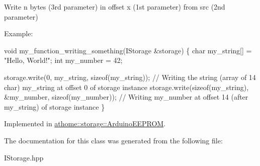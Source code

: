 Write n bytes (3rd parameter) in offset x (1st parameter) from src (2nd parameter)

Example\+:


\begin{DoxyCode}
\textcolor{keywordtype}{void} my\_function\_writing\_something(IStorage &storage) \{
  \textcolor{keywordtype}{char} my\_string[] = \textcolor{stringliteral}{"Hello, World!"};
  \textcolor{keywordtype}{int} my\_number = 42;

  storage.write(0, my\_string, \textcolor{keyword}{sizeof}(my\_string)); \textcolor{comment}{// Writing the string (array of 14 char) my\_string at
       offset 0 of storage instance}
  storage.write(\textcolor{keyword}{sizeof}(my\_string), &my\_number, \textcolor{keyword}{sizeof}(my\_number)); \textcolor{comment}{// Writing my\_number at offset 14 (after
       my\_string) of storage instance}
\}
\end{DoxyCode}
 

Implemented in \mbox{\hyperlink{classathome_1_1storage_1_1_arduino_e_e_p_r_o_m_a20027ab8a5b20c1fad3e3e42daafe53d}{athome\+::storage\+::\+Arduino\+E\+E\+P\+R\+OM}}.



The documentation for this class was generated from the following file\+:\begin{DoxyCompactItemize}
\item 
I\+Storage.\+hpp\end{DoxyCompactItemize}

